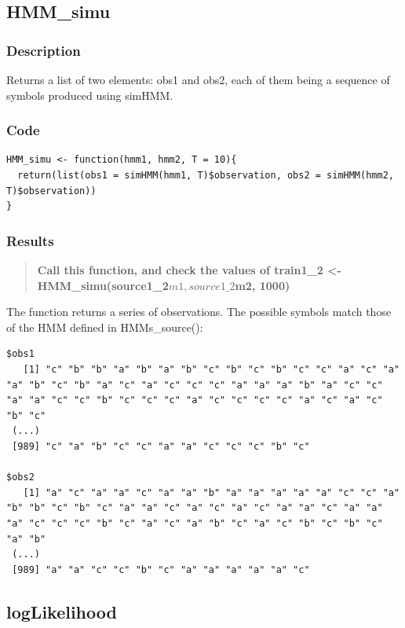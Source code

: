 \documentclass[a4paper]{article}
\begin{document}
\subsection{HMM\_simu}

\subsubsection{Description}

Returns a list of two elements: obs1 and obs2, each of them being a sequence of symbols produced using simHMM.

\subsubsection{Code}

\begin{lstlisting}
HMM_simu <- function(hmm1, hmm2, T = 10){
  return(list(obs1 = simHMM(hmm1, T)$observation, obs2 = simHMM(hmm2, T)$observation))
}
\end{lstlisting}

\subsubsection{Results}

\begin{quotation}
\textbf{Call this function, and check the values of train1\_2 <- HMM\_simu(source1\_2$m1, source1\_2$m2, 1000)}
\end{quotation}

The function returns a series of observations. The possible symbols match those of the HMM defined in HMMs\_source():

\begin{lstlisting}
$obs1
   [1] "c" "b" "b" "a" "b" "a" "b" "c" "b" "c" "b" "c" "c" "a" "c" "a" "a" "b" "c" "b" "a" "c" "a" "c" "c" "c" "a" "a" "a" "b" "a" "c" "c" "a" "a" "c" "c" "b" "c" "c" "c" "a" "c" "c" "c" "c" "a" "c" "a" "c" "b" "c"
 (...)
 [989] "c" "a" "b" "c" "c" "a" "a" "c" "c" "c" "b" "c"

$obs2
   [1] "a" "c" "a" "a" "c" "a" "a" "b" "a" "a" "a" "a" "a" "c" "c" "a" "b" "b" "c" "b" "c" "a" "a" "c" "a" "c" "a" "c" "a" "a" "c" "a" "a" "a" "c" "c" "c" "b" "c" "a" "c" "a" "b" "c" "a" "c" "b" "c" "b" "c" "a" "b"
 (...)
 [989] "a" "a" "c" "c" "b" "c" "a" "a" "a" "a" "a" "c"
\end{lstlisting}

\subsection{logLikelihood}
\end{document}
